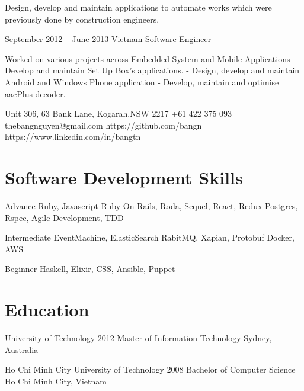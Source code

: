 \documentclass{tccv}
\begin{document}
\begin{eventlist}
    Design, develop and maintain applications to automate works which were previously done by construction engineers.

\item{September 2012 -- June 2013}
    {Vietnam}
    {Software Engineer}

    Worked on various projects across Embedded System and Mobile Applications
    \newline - Develop and maintain Set Up Box's applications.
    \newline - Design, develop and maintain Android and Windows Phone application
    \newline - Develop, maintain and optimise aacPlus decoder.

\end{eventlist}

\personal
    {Unit 306, 63 Bank Lane, Kogarah,\newline NSW 2217}
    {+61 422 375 093}
    {thebangnguyen@gmail.com}
    {https://github.com/bangn}
    {https://www.linkedin.com/in/bangtn}

\section{Software Development Skills}

\begin{factlist}

\item{Advance}
    {Ruby, Javascript
    \newline Ruby On Rails, Roda, Sequel, React, Redux
    \newline Postgres, Rspec,
    \newline Agile Development, TDD}

\item{Intermediate}
    {EventMachine, ElasticSearch
    \newline RabitMQ, Xapian, Protobuf
    \newline Docker, AWS}

\item{Beginner}
    {Haskell, Elixir, CSS, Ansible, Puppet}
\end{factlist}

\section{Education}

\begin{yearlist}

\item[University of Technology]{2012}
    {Master of Information Technology}
    {Sydney, Australia}

\item[Ho Chi Minh City University of Technology]{2008}
    {Bachelor of Computer Science}
    {Ho Chi Minh City, Vietnam}

\end{yearlist}
\end{document}
